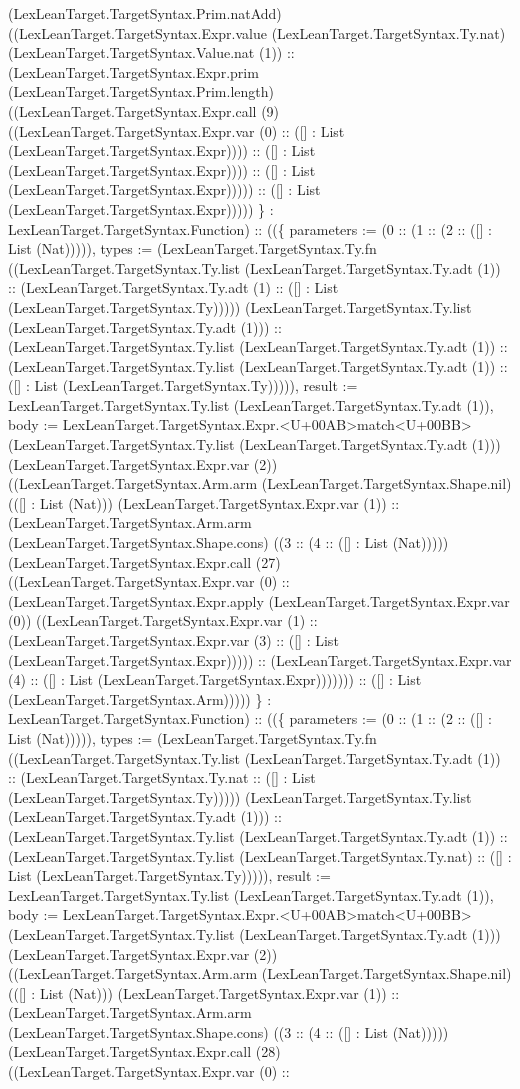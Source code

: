 \documentclass[11pt]{article}
\begin{document}
(LexLeanTarget.TargetSyntax.Prim.natAdd) ((LexLeanTarget.TargetSyntax.Expr.value (LexLeanTarget.TargetSyntax.Ty.nat) (LexLeanTarget.TargetSyntax.Value.nat (1)) :: (LexLeanTarget.TargetSyntax.Expr.prim (LexLeanTarget.TargetSyntax.Prim.length) ((LexLeanTarget.TargetSyntax.Expr.call (9) ((LexLeanTarget.TargetSyntax.Expr.var (0) :: ([] : List (LexLeanTarget.TargetSyntax.Expr)))) :: ([] : List (LexLeanTarget.TargetSyntax.Expr)))) :: ([] : List (LexLeanTarget.TargetSyntax.Expr))))) :: ([] : List (LexLeanTarget.TargetSyntax.Expr))))) \} : LexLeanTarget.TargetSyntax.Function) :: ((\{ parameters := (0 :: (1 :: (2 :: ([] : List (Nat))))), types := (LexLeanTarget.TargetSyntax.Ty.fn ((LexLeanTarget.TargetSyntax.Ty.list (LexLeanTarget.TargetSyntax.Ty.adt (1)) :: (LexLeanTarget.TargetSyntax.Ty.adt (1) :: ([] : List (LexLeanTarget.TargetSyntax.Ty))))) (LexLeanTarget.TargetSyntax.Ty.list (LexLeanTarget.TargetSyntax.Ty.adt (1))) :: (LexLeanTarget.TargetSyntax.Ty.list (LexLeanTarget.TargetSyntax.Ty.adt (1)) :: (LexLeanTarget.TargetSyntax.Ty.list (LexLeanTarget.TargetSyntax.Ty.adt (1)) :: ([] : List (LexLeanTarget.TargetSyntax.Ty))))), result := LexLeanTarget.TargetSyntax.Ty.list (LexLeanTarget.TargetSyntax.Ty.adt (1)), body := LexLeanTarget.TargetSyntax.Expr.<U+00AB>match<U+00BB> (LexLeanTarget.TargetSyntax.Ty.list (LexLeanTarget.TargetSyntax.Ty.adt (1))) (LexLeanTarget.TargetSyntax.Expr.var (2)) ((LexLeanTarget.TargetSyntax.Arm.arm (LexLeanTarget.TargetSyntax.Shape.nil) (([] : List (Nat))) (LexLeanTarget.TargetSyntax.Expr.var (1)) :: (LexLeanTarget.TargetSyntax.Arm.arm (LexLeanTarget.TargetSyntax.Shape.cons) ((3 :: (4 :: ([] : List (Nat))))) (LexLeanTarget.TargetSyntax.Expr.call (27) ((LexLeanTarget.TargetSyntax.Expr.var (0) :: (LexLeanTarget.TargetSyntax.Expr.apply (LexLeanTarget.TargetSyntax.Expr.var (0)) ((LexLeanTarget.TargetSyntax.Expr.var (1) :: (LexLeanTarget.TargetSyntax.Expr.var (3) :: ([] : List (LexLeanTarget.TargetSyntax.Expr))))) :: (LexLeanTarget.TargetSyntax.Expr.var (4) :: ([] : List (LexLeanTarget.TargetSyntax.Expr))))))) :: ([] : List (LexLeanTarget.TargetSyntax.Arm))))) \} : LexLeanTarget.TargetSyntax.Function) :: ((\{ parameters := (0 :: (1 :: (2 :: ([] : List (Nat))))), types := (LexLeanTarget.TargetSyntax.Ty.fn ((LexLeanTarget.TargetSyntax.Ty.list (LexLeanTarget.TargetSyntax.Ty.adt (1)) :: (LexLeanTarget.TargetSyntax.Ty.nat :: ([] : List (LexLeanTarget.TargetSyntax.Ty))))) (LexLeanTarget.TargetSyntax.Ty.list (LexLeanTarget.TargetSyntax.Ty.adt (1))) :: (LexLeanTarget.TargetSyntax.Ty.list (LexLeanTarget.TargetSyntax.Ty.adt (1)) :: (LexLeanTarget.TargetSyntax.Ty.list (LexLeanTarget.TargetSyntax.Ty.nat) :: ([] : List (LexLeanTarget.TargetSyntax.Ty))))), result := LexLeanTarget.TargetSyntax.Ty.list (LexLeanTarget.TargetSyntax.Ty.adt (1)), body := LexLeanTarget.TargetSyntax.Expr.<U+00AB>match<U+00BB> (LexLeanTarget.TargetSyntax.Ty.list (LexLeanTarget.TargetSyntax.Ty.adt (1))) (LexLeanTarget.TargetSyntax.Expr.var (2)) ((LexLeanTarget.TargetSyntax.Arm.arm (LexLeanTarget.TargetSyntax.Shape.nil) (([] : List (Nat))) (LexLeanTarget.TargetSyntax.Expr.var (1)) :: (LexLeanTarget.TargetSyntax.Arm.arm (LexLeanTarget.TargetSyntax.Shape.cons) ((3 :: (4 :: ([] : List (Nat))))) (LexLeanTarget.TargetSyntax.Expr.call (28) ((LexLeanTarget.TargetSyntax.Expr.var (0) :: 
\end{document}
